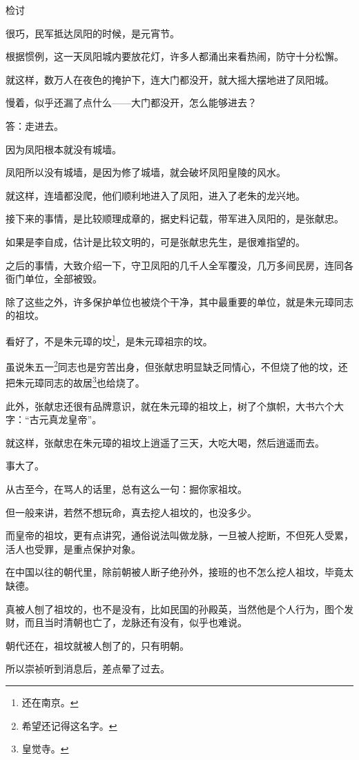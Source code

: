 \begin{multicols}{\theparacolNo}
		检讨

		很巧，民军抵达凤阳的时候，是元宵节。

		根据惯例，这一天凤阳城内要放花灯，许多人都涌出来看热闹，防守十分松懈。

		就这样，数万人在夜色的掩护下，连大门都没开，就大摇大摆地进了凤阳城。

		慢着，似乎还漏了点什么——大门都没开，怎么能够进去？

		答：走进去。

		因为凤阳根本就没有城墙。

		凤阳所以没有城墙，是因为修了城墙，就会破坏凤阳皇陵的风水。

		就这样，连墙都没爬，他们顺利地进入了凤阳，进入了老朱的龙兴地。

		接下来的事情，是比较顺理成章的，据史料记载，带军进入凤阳的，是张献忠。

		如果是李自成，估计是比较文明的，可是张献忠先生，是很难指望的。

		之后的事情，大致介绍一下，守卫凤阳的几千人全军覆没，几万多间民房，连同各衙门单位，全部被毁。

		除了这些之外，许多保护单位也被烧个干净，其中最重要的单位，就是朱元璋同志的祖坟。

		看好了，不是朱元璋的坟\footnote{还在南京。}，是朱元璋祖宗的坟。

		虽说朱五一\footnote{希望还记得这名字。}同志也是穷苦出身，但张献忠明显缺乏同情心，不但烧了他的坟，还把朱元璋同志的故居\footnote{皇觉寺。}也给烧了。

		此外，张献忠还很有品牌意识，就在朱元璋的祖坟上，树了个旗帜，大书六个大字：“古元真龙皇帝”。

		就这样，张献忠在朱元璋的祖坟上逍遥了三天，大吃大喝，然后逍遥而去。

		事大了。

		从古至今，在骂人的话里，总有这么一句：掘你家祖坟。

		但一般来讲，若然不想玩命，真去挖人祖坟的，也没多少。

		而皇帝的祖坟，更有点讲究，通俗说法叫做龙脉，一旦被人挖断，不但死人受累，活人也受罪，是重点保护对象。

		在中国以往的朝代里，除前朝被人断子绝孙外，接班的也不怎么挖人祖坟，毕竟太缺德。

		真被人刨了祖坟的，也不是没有，比如民国的孙殿英，当然他是个人行为，图个发财，而且当时清朝也亡了，龙脉还有没有，似乎也难说。

		朝代还在，祖坟就被人刨了的，只有明朝。

		所以崇祯听到消息后，差点晕了过去。


\end{multicols}
